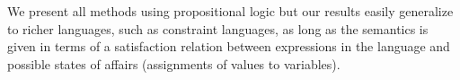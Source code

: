We
present all methods using propositional logic but our results easily generalize to richer languages, such as constraint languages, as long as the semantics is given in terms of a satisfaction relation  between expressions in the language and possible states of affairs (assignments of values to variables).
 
%  
% 
% 

